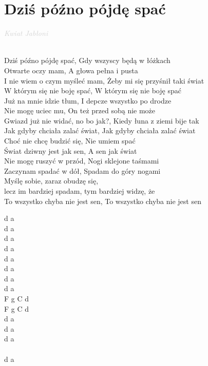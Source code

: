 \documentclass[a5paper, 10pt]{book}
\begin{document}
\newpage
\section{Dziś późno pójdę spać}\textcolor{lightgray}{\textit{Kwiat Jabłoni}}\\~\\
\begin{minipage}[t]{0.85\textwidth}
Dziś późno pójdę spać, Gdy wszyscy będą w łóżkach\\
Otwarte oczy mam, A głowa pełna i pusta\\
I nie wiem o czym myśleć mam, Żeby mi się przyśnił taki świat\\
W którym się nie boję spać, W którym się nie boję spać\\

Już na mnie idzie tłum, I depcze wszystko po drodze\\
Nie mogę uciec mu, On też przed sobą nie może\\
Gwiazd już nie widać, no bo jak?, Kiedy łuna z ziemi bije tak\\
Jak gdyby chciała zalać świat, Jak gdyby chciała zalać świat\\

\hspace*{6mm} Choć nie chcę budzić się, Nie umiem spać\\
\hspace*{6mm} Świat dziwny jest jak sen, A sen jak świat\\

Nie mogę ruszyć w przód, Nogi sklejone taśmami\\
Zaczynam spadać w dół, Spadam do góry nogami\\
Myślę sobie, zaraz obudzę się, \\\hspace*{20mm}lecz im bardziej spadam, tym bardziej widzę, że\\
To wszystko chyba nie jest sen, To wszystko chyba nie jest sen\\

\end{minipage}
\begin{minipage}[t]{0.15\textwidth}
d a\\
d a\\
d a\\
d a\\

d a\\
d a\\
d a\\
d a\\

F g C d\\
F g C d\\

d a\\
d a\\
d a\\~\\
d a\\

\end{minipage}
\end{document}
